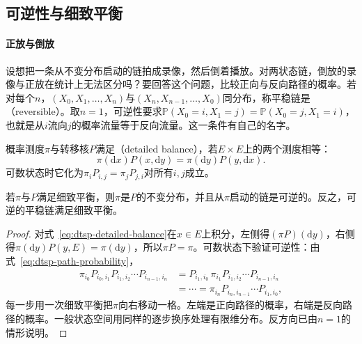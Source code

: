 \subsection{可逆性与细致平衡}
\label{sec:dtsp-reversibility}

\paragraph{正放与倒放}
设想把一条从不变分布启动的链拍成录像，然后倒着播放。对两状态链，倒放的录像与正放在统计上无法区分吗？要回答这个问题，比较正向与反向路径的概率。若对每个$n$，$(X_0,X_1,\ldots,X_n)$与$(X_n,X_{n-1},\ldots,X_0)$同分布，称平稳链是（reversible）。取$n=1$，可逆性要求$\mathbb P(X_0=i,X_1=j)=\mathbb P(X_0=j,X_1=i)$，也就是从$i$流向$j$的概率流量等于反向流量。这一条件有自己的名字。

\begin{definition}[细致平衡]
  \label{def:dtsp-detailed-balance}
  概率测度$\pi$与转移核$P$满足（detailed balance），若$E\times E$上的两个测度相等：
  \begin{equation}
    \pi(\mathrm dx)P(x,\mathrm dy)=\pi(\mathrm dy)P(y,\mathrm dx).
    \label{eq:dtsp-detailed-balance}
  \end{equation}
  可数状态时它化为$\pi_iP_{i,j}=\pi_jP_{j,i}$对所有$i,j$成立。
\end{definition}

\begin{theorem}
  \label{thm:dtsp-detailed-balance}
  若$\pi$与$P$满足细致平衡，则$\pi$是$P$的不变分布，并且从$\pi$启动的链是可逆的。反之，可逆的平稳链满足细致平衡。
\end{theorem}

\begin{proof}
对式~\eqref{eq:dtsp-detailed-balance}在$x\in E$上积分，左侧得$(\pi P)(\mathrm dy)$，右侧得$\pi(\mathrm dy)P(y,E)=\pi(\mathrm dy)$，所以$\pi P=\pi$。可数状态下验证可逆性：由式~\eqref{eq:dtsp-path-probability}，
\[
  \begin{aligned}
    \pi_{i_0}P_{i_0,i_1}P_{i_1,i_2}\cdots P_{i_{n-1},i_n}
    &=P_{i_1,i_0}\,\pi_{i_1}P_{i_1,i_2}\cdots P_{i_{n-1},i_n}\\
    &=\cdots
    =\pi_{i_n}P_{i_n,i_{n-1}}\cdots P_{i_1,i_0},
  \end{aligned}
\]
每一步用一次细致平衡把$\pi$向右移动一格。左端是正向路径的概率，右端是反向路径的概率。一般状态空间用同样的逐步换序处理有限维分布。反方向已由$n=1$的情形说明。
\end{proof}

